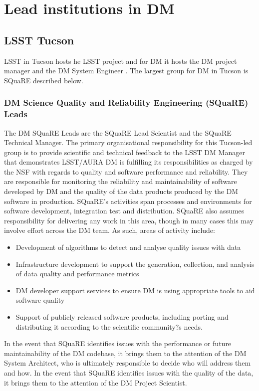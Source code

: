 \section {Lead institutions in DM } \label{sect:leadtutes}
\subsection {LSST Tucson}\label{sect:tucson}
LSST in Tucson hosts he LSST project and for DM it hosts  the DM project manager  and the DM System Engineer . The largest group for DM in Tucson is SQuaRE described below. 

\subsubsection{DM Science Quality and Reliability Engineering (SQuaRE) Leads \label{sect:square}}
The DM SQuaRE Leads are the SQuaRE Lead Scientist and the SQuaRE Technical Manager.  The primary organisational responsibility for this Tucson-led group is to provide scientific and technical feedback to the LSST DM Manager that demonstrates LSST/AURA DM is fulfilling its responsibilities as charged by the NSF with regards to quality and software performance and reliability.
They are responsible for monitoring the reliability and maintainability of software developed by DM and the quality of the data products produced by the DM software in production. SQuaRE's activities span processes and environments for software development, integration test and distribution.  SQuaRE also assumes responsibility for delivering any work in this area, though in many cases this may involve effort across the DM team.
As such, areas of activity include:
\begin{itemize}
	\item Development of algorithms to detect and analyse quality issues with data
	\item Infrastructure development to support the generation, collection, and analysis of data quality and performance metrics
	\item DM developer support services to ensure DM is using appropriate tools to aid software quality
	\item Support of publicly released software products, including porting and distributing it according to the scientific community?s needs.
\end{itemize}

In the event that SQuaRE identifies issues with the performance or future maintainability of the DM codebase, it brings them to the attention of the DM System Architect, who is ultimately responsible to decide who will address them and how. In the event that SQuaRE identifies issues with the quality of the data, it brings them to the attention of the DM Project Scientist.


